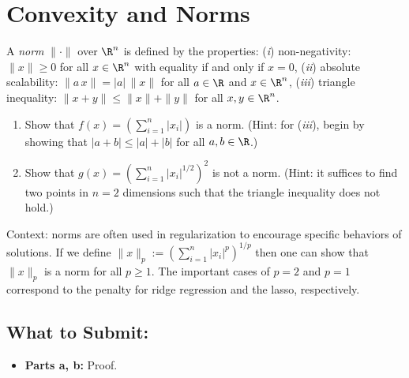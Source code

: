 \documentclass{article}
\begin{document}
\section*{Convexity and Norms }

\begin{aprob}
    A \emph{norm} $\|\cdot\|$ over $\R^n$ is defined by the properties:
    (\textit{i}) non-negativity: $\|x\|\geq 0$ for all $x \in \R^n$ with equality if and only if $x=0$,
    (\textit{ii}) absolute scalability: $\|a \, x\| = |a| \, \|x\|$ for all $a \in \R$ and $x \in \R^n$, 
    (\textit{iii}) triangle inequality: $\|x+y\| \leq \|x\| + \|y\|$ for all $x,y \in \R^n$.
    \begin{enumerate}
      \item {} Show that $f(x) = \left( \sum_{i=1}^n |x_i| \right)$ is a norm. (Hint: for (\textit{iii}), begin by showing that $|a+b|\leq |a| + |b|$ for all $a,b \in \R$.)
      \item {} Show that $g(x) = \left(\sum_{i=1}^n |x_i|^{1/2}\right)^2$ is not a norm. (Hint: it suffices to find two points in $n=2$ dimensions such that the triangle inequality does not hold.)
    \end{enumerate} 
    Context: norms are often used in regularization to encourage specific behaviors of solutions. If we define  $\| x \|_p := \left( \sum_{i=1}^n |x_i|^{p} \right)^{1/p}$ then one can show that $\| x \|_p$ is a norm for all $p \geq 1$. The important cases of $p=2$ and $p=1$ correspond to the penalty for ridge regression and the lasso, respectively. \\
    
    \subsection*{What to Submit:}
    \begin{itemize}
        \item \textbf{Parts a, b:} Proof.
    \end{itemize}
\end{aprob}
\end{document}
